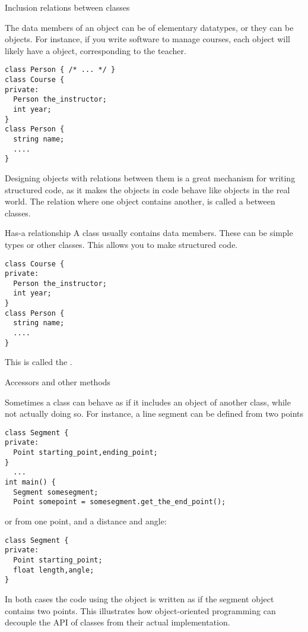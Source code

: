 
 {Inclusion relations between classes}
\label{sec:hasa}

The data members of an object can be of elementary datatypes, or they
can be objects. For instance, if you write software to manage courses,
each  object will likely have a  object,
corresponding to the teacher.
\begin{lstlisting}
class Person { /* ... */ }
class Course {
private:
  Person the_instructor;
  int year;
}
class Person {
  string name;
  ....
}
\end{lstlisting}

Designing objects with relations between them
is a great mechanism for writing structured code,
as it makes the objects in code behave like objects in the real world.
The relation where one object contains another, is called a
 between classes.

\begin{slide}{Has-a relationship}
  \label{sl:obj-hasa}
  A class usually contains data members. These can be simple types or
  other classes. This allows you to make structured code.
\begin{lstlisting}
class Course {
private:
  Person the_instructor;
  int year;
}
class Person {
  string name;
  ....
}
\end{lstlisting}
  This is
  called the .  
\end{slide}

 {Accessors and other methods}

Sometimes a class can behave as if it includes an object of another
class, while not actually doing so. For instance, a line segment can
be defined from two points
\begin{lstlisting}
class Segment {
private:
  Point starting_point,ending_point;
}
  ...
int main() {
  Segment somesegment;
  Point somepoint = somesegment.get_the_end_point();
\end{lstlisting}
or from one point, and a distance and angle:
\begin{lstlisting}
class Segment {
private:
  Point starting_point;
  float length,angle;
}
\end{lstlisting}
In both cases the code using the object is written as if the segment
object contains two points.
This illustrates how object-oriented programming can decouple the
\ac{API} of classes from their actual implementation.

